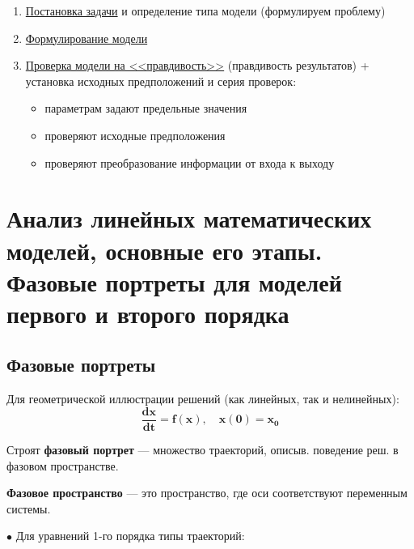 	\begin{enumerate}
		\item \uline{Постановка задачи} и определение типа модели (формулируем проблему)
		\item \uline{Формулирование модели}
		\item \uline{Проверка модели на <<правдивость>>} (правдивость результатов) + установка исходных предположений и серия проверок:
		\begin{itemize}
			\item параметрам задают предельные значения
			\item проверяют исходные предположения
			\item проверяют преобразование информации от входа к выходу
		\end{itemize}
	\end{enumerate}
	
	\newpage
	
	\section{Анализ линейных математических моделей, основные его этапы. Фазовые портреты для моделей первого и второго порядка}
	
	\subsection{Фазовые портреты}
	
	Для геометрической иллюстрации решений (как линейных, так и нелинейных):
	\begin{equation}
		\mathbf{\frac{dx}{dt} = f(x), \quad x(0) = x_0}
	\end{equation}
	
	Строят \textbf{фазовый портрет} — множество траекторий, описыв. поведение реш. в фазовом пространстве.
	\par
	\textbf{Фазовое пространство} — это пространство, где оси соответствуют переменным системы.
	\par
	\vspace{0.5em}
	$\bullet$ Для уравнений 1-го порядка типы траекторий:
	{\setcounter{ruscount}{0} %
	}
	
